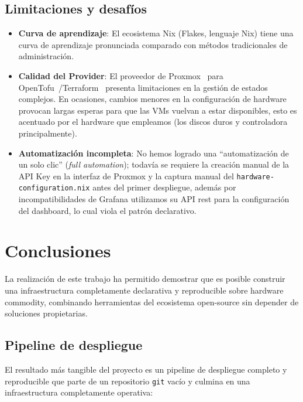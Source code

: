 \documentclass[a4paper, 11pt]{article}
\begin{document}
\subsection{Limitaciones y desafíos}
\begin{itemize}
    \item \textbf{Curva de aprendizaje}: El ecosistema Nix (Flakes, lenguaje Nix) tiene una curva de aprendizaje pronunciada comparado con métodos tradicionales de administración.
    \item \textbf{Calidad del Provider}: El proveedor de Proxmox~\cite{proxmox} para OpenTofu~\cite{opentofu}/Terraform~\cite{terraform} presenta limitaciones 
      en la gestión de estados complejos. En ocasiones, cambios menores en la configuración de hardware provocan largas 
      esperas para que las VMs vuelvan a estar disponibles, esto es acentuado por el hardware que empleamos (los discos duros y controladora principalmente).
    \item \textbf{Automatización incompleta}: No hemos logrado una ``automatización de un solo clic'' (\textit{full automation});
      todavía se requiere la creación manual de la API Key en la interfaz de Proxmox y la captura manual del 
      \texttt{hardware-configuration.nix} antes del primer despliegue, 
      además por incompatibilidades de Grafana utilizamos su API rest para la configuración del dashboard, lo cual viola el patrón declarativo.
\end{itemize}

\section{Conclusiones}

La realización de este trabajo ha permitido demostrar que es posible construir una
infraestructura completamente declarativa y reproducible sobre hardware commodity,
combinando herramientas del ecosistema open-source sin depender de soluciones propietarias.

\subsection{Pipeline de despliegue}

El resultado más tangible del proyecto es un pipeline de despliegue completo y reproducible
que parte de un repositorio \texttt{git} vacío y culmina en una infraestructura completamente
operativa:
\end{document}
